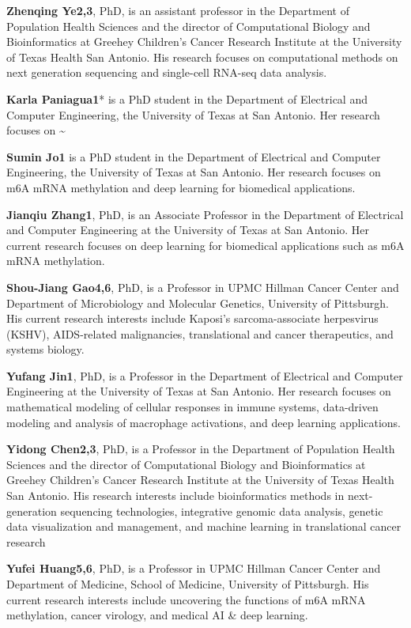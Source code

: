 \documentclass[
]{book}
\begin{document}
\textbf{Zhenqing Ye2,3}, PhD, is an assistant professor in the Department of Population Health Sciences and the director of Computational Biology and Bioinformatics at Greehey Children's Cancer Research Institute at the University of Texas Health San Antonio. His research focuses on computational methods on next generation sequencing and single-cell RNA-seq data analysis.

\textbf{Karla Paniagua1}* is a PhD student in the Department of Electrical and Computer Engineering, the University of Texas at San Antonio. Her research focuses on \textasciitilde{}

\textbf{Sumin Jo1} is a PhD student in the Department of Electrical and Computer Engineering, the University of Texas at San Antonio. Her research focuses on m6A mRNA methylation and deep learning for biomedical applications.

\textbf{Jianqiu Zhang1}, PhD, is an Associate Professor in the Department of Electrical and Computer Engineering at the University of Texas at San Antonio. Her current research focuses on deep learning for biomedical applications such as m6A mRNA methylation.

\textbf{Shou-Jiang Gao4,6}, PhD, is a Professor in UPMC Hillman Cancer Center and Department of Microbiology and Molecular Genetics, University of Pittsburgh. His current research interests include Kaposi's sarcoma-associate herpesvirus (KSHV), AIDS-related malignancies, translational and cancer therapeutics, and systems biology.

\textbf{Yufang Jin1}, PhD, is a Professor in the Department of Electrical and Computer Engineering at the University of Texas at San Antonio. Her research focuses on mathematical modeling of cellular responses in immune systems, data-driven modeling and analysis of macrophage activations, and deep learning applications.

\textbf{Yidong Chen2,3}, PhD, is a Professor in the Department of Population Health Sciences and the director of Computational Biology and Bioinformatics at Greehey Children's Cancer Research Institute at the University of Texas Health San Antonio. His research interests include bioinformatics methods in next-generation sequencing technologies, integrative genomic data analysis, genetic data visualization and management, and machine learning in translational cancer research

\textbf{Yufei Huang5,6}, PhD, is a Professor in UPMC Hillman Cancer Center and Department of Medicine, School of Medicine, University of Pittsburgh. His current research interests include uncovering the functions of m6A mRNA methylation, cancer virology, and medical AI \& deep learning.
\end{document}
